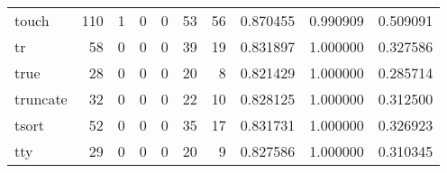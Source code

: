 \begin{tabular}{lrrrrrrrrr}
touch     &                                       110 &                                                  1 &                                                  0 &                                                  0 &                                                 53 &                                                 56 &                                           0.870455 &                               0.990909 &                             0.509091 \\
tr        &                                        58 &                                                  0 &                                                  0 &                                                  0 &                                                 39 &                                                 19 &                                           0.831897 &                               1.000000 &                             0.327586 \\
true      &                                        28 &                                                  0 &                                                  0 &                                                  0 &                                                 20 &                                                  8 &                                           0.821429 &                               1.000000 &                             0.285714 \\
truncate  &                                        32 &                                                  0 &                                                  0 &                                                  0 &                                                 22 &                                                 10 &                                           0.828125 &                               1.000000 &                             0.312500 \\
tsort     &                                        52 &                                                  0 &                                                  0 &                                                  0 &                                                 35 &                                                 17 &                                           0.831731 &                               1.000000 &                             0.326923 \\
tty       &                                        29 &                                                  0 &                                                  0 &                                                  0 &                                                 20 &                                                  9 &                                           0.827586 &                               1.000000 &                             0.310345 \\

\end{tabular}
